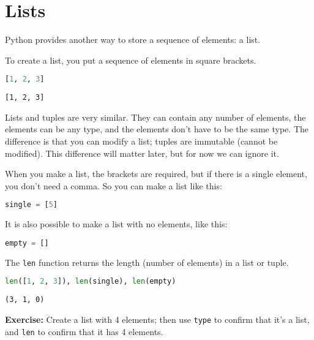 \hypertarget{lists}{%
\section{Lists}\label{lists}}

Python provides another way to store a sequence of elements: a list.

To create a list, you put a sequence of elements in square brackets.

\begin{lstlisting}[language=Python,style=source]
[1, 2, 3]
\end{lstlisting}

\begin{lstlisting}[style=output]
[1, 2, 3]
\end{lstlisting}

Lists and tuples are very similar. They can contain any number of
elements, the elements can be any type, and the elements don't have to
be the same type. The difference is that you can modify a list; tuples
are immutable (cannot be modified). This difference will matter later,
but for now we can ignore it.

When you make a list, the brackets are required, but if there is a
single element, you don't need a comma. So you can make a list like
this:

\begin{lstlisting}[language=Python,style=source]
single = [5]
\end{lstlisting}

It is also possible to make a list with no elements, like this:

\begin{lstlisting}[language=Python,style=source]
empty = []
\end{lstlisting}

The \passthrough{\lstinline!len!} function returns the length (number of
elements) in a list or tuple.

\begin{lstlisting}[language=Python,style=source]
len([1, 2, 3]), len(single), len(empty)
\end{lstlisting}

\begin{lstlisting}[style=output]
(3, 1, 0)
\end{lstlisting}

\textbf{Exercise:} Create a list with 4 elements; then use
\passthrough{\lstinline!type!} to confirm that it's a list, and
\passthrough{\lstinline!len!} to confirm that it has 4 elements.

